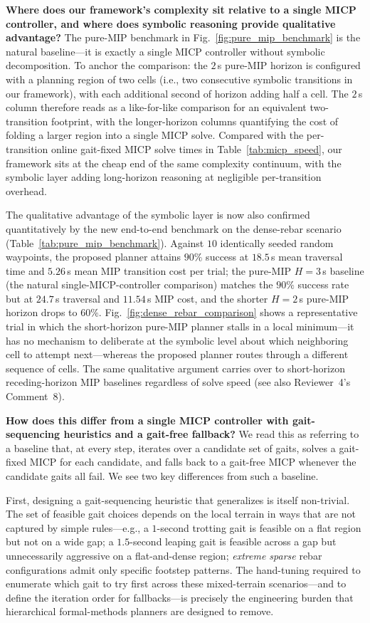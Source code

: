 \noindent \textbf{Where does our framework's complexity sit relative to a single MICP controller, and where does symbolic reasoning provide qualitative advantage?} The pure-MIP benchmark in Fig.~\ref{fig:pure_mip_benchmark} is the natural baseline---it is exactly a single MICP controller without symbolic decomposition. To anchor the comparison: the $2$\,s pure-MIP horizon is configured with a planning region of two cells (i.e., two consecutive symbolic transitions in our framework), with each additional second of horizon adding half a cell. The $2$\,s column therefore reads as a like-for-like comparison for an equivalent two-transition footprint, with the longer-horizon columns quantifying the cost of folding a larger region into a single MICP solve. Compared with the per-transition online gait-fixed MICP solve times in Table~\ref{tab:micp_speed}, our framework sits at the cheap end of the same complexity continuum, with the symbolic layer adding long-horizon reasoning at negligible per-transition overhead.

The qualitative advantage of the symbolic layer is now also confirmed quantitatively by the new end-to-end benchmark on the dense-rebar scenario (Table~\ref{tab:pure_mip_benchmark}). Against $10$ identically seeded random waypoints, the proposed planner attains $90\%$ success at $18.5$\,s mean traversal time and $5.26$\,s mean MIP transition cost per trial; the pure-MIP $H{=}3$\,s baseline (the natural single-MICP-controller comparison) matches the $90\%$ success rate but at $24.7$\,s traversal and $11.54$\,s MIP cost, and the shorter $H{=}2$\,s pure-MIP horizon drops to $60\%$. Fig.~\ref{fig:dense_rebar_comparison} shows a representative trial in which the short-horizon pure-MIP planner stalls in a local minimum---it has no mechanism to deliberate at the symbolic level about which neighboring cell to attempt next---whereas the proposed planner routes through a different sequence of cells. The same qualitative argument carries over to short-horizon receding-horizon MIP baselines regardless of solve speed (see also Reviewer~4's Comment~8).

\noindent \textbf{How does this differ from a single MICP controller with gait-sequencing heuristics and a gait-free fallback?} We read this as referring to a baseline that, at every step, iterates over a candidate set of gaits, solves a gait-fixed MICP for each candidate, and falls back to a gait-free MICP whenever the candidate gaits all fail. We see two key differences from such a baseline.

First, designing a gait-sequencing heuristic that generalizes is itself non-trivial. The set of feasible gait choices depends on the local terrain in ways that are not captured by simple rules---e.g., a $1$-second trotting gait is feasible on a flat region but not on a wide gap; a $1.5$-second leaping gait is feasible across a gap but unnecessarily aggressive on a flat-and-dense region; \textit{extreme sparse} rebar configurations admit only specific footstep patterns. The hand-tuning required to enumerate which gait to try first across these mixed-terrain scenarios---and to define the iteration order for fallbacks---is precisely the engineering burden that hierarchical formal-methods planners are designed to remove.

